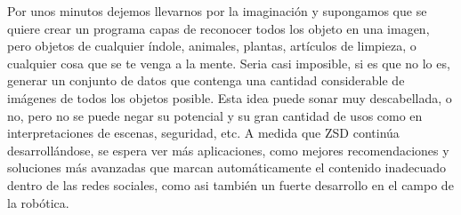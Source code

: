 Por unos minutos dejemos llevarnos por la imaginación y supongamos que se quiere crear un programa capas de reconocer todos los objeto en una imagen, pero objetos de cualquier índole, animales, plantas, artículos de limpieza, o cualquier cosa que se te venga a la mente. Seria casi imposible, si es que no lo es, generar un conjunto de datos que contenga una cantidad considerable de imágenes de todos los objetos posible. Esta idea puede sonar muy descabellada, o no, pero no se puede negar su potencial y su gran cantidad de usos como en interpretaciones de escenas, seguridad, etc. A medida que ZSD continúa desarrollándose, se espera ver más aplicaciones, como mejores recomendaciones y soluciones más avanzadas que marcan automáticamente el contenido inadecuado dentro de las redes sociales, como asi también un fuerte desarrollo en el campo de la robótica.
